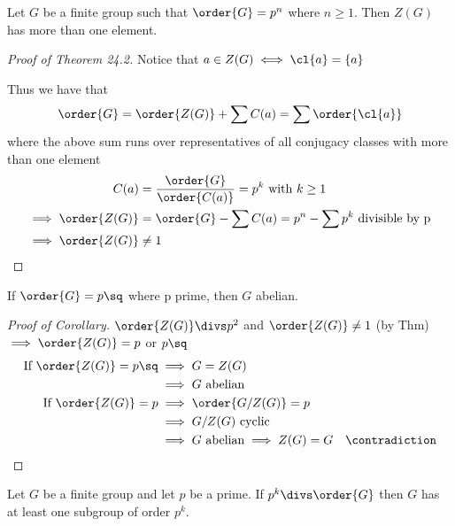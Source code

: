 \begin{theorem}
    Let \(G\) be a finite group such that \(\order{G} = p^n\) where \(n\geq 1\). Then \(Z(G)\) has more than one element.
\end{theorem}

\begin{proof}[Proof of Theorem 24.2]
    Notice that \(a\in Z(G) \iff \cl{a}=\{a\}\)

    Thus we have that \begin{align*}
        \order{G} = \order{Z(G)} + \sum\index{G}{C(a)} = \sum \order{\cl{a}}
    \end{align*} where the above sum runs over representatives of all conjugacy classes with more than one element
    \begin{align*}
        \index{G}{C(a)} &= \frac{\order{G}}{\order{C(a)}} = p^k\text{ with } k \geq 1 \\
        \implies \order{Z(G)} &= \order{G} - \sum\index{G}{C(a)} = p^n - \sum p^k \text{ divisible by p} \\
        \implies \order{Z(G)} &\neq 1
    \end{align*}
\end{proof}

\begin{corollary}
  If \(\order{G} = p\sq\) where p prime, then \(G\) abelian.
\end{corollary}

\begin{proof}[Proof of Corollary]
    \(\order{Z(G)} \divs p^2\) and \(\order{Z(G)}\neq 1\) (by Thm) \(\implies \order{Z(G)}=p\) or \(p\sq\)
    \begin{align*}
        \text{If } \order{Z(G)} = p\sq &\implies G = Z(G) \\
        &\implies G \text{ abelian} \\
        \text{If } \order{Z(G)} = p &\implies \order{G/Z(G)} = p \\
        &\implies G/Z(G) \text{ cyclic} \\
        &\implies G \text{ abelian} \implies Z(G) = G \quad \contradiction
    \end{align*}
\end{proof}

\begin{theorem}
  Let \(G\) be a finite group and let \(p\) be a prime. If \(p^k \divs \order{G}\) then \(G\) has at least one subgroup of order \(p^k\).
\end{theorem}

